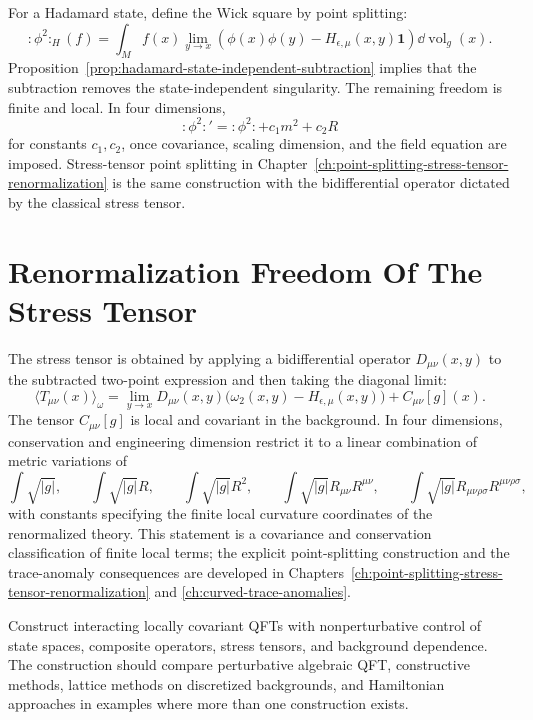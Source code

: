For a Hadamard state, define the Wick square by point splitting:
\[
  :\!\phi^2\!:_H(f)
  =
  \int_M f(x)
  \lim_{y\to x}
  \left(\phi(x)\phi(y)-H_{\epsilon,\mu}(x,y)\mathbf 1\right)
  \dd\operatorname{vol}_g(x).
\]
Proposition~\ref{prop:hadamard-state-independent-subtraction} implies that
the subtraction removes the state-independent singularity.  The remaining
freedom is finite and local.  In four dimensions,
\[
  :\!\phi^2\!:'=
  :\!\phi^2\!:+c_1m^2+c_2R
\]
for constants \(c_1,c_2\), once covariance, scaling dimension, and the field
equation are imposed.  Stress-tensor point splitting in
Chapter~\ref{ch:point-splitting-stress-tensor-renormalization} is the same
construction with the bidifferential operator dictated by the classical stress
tensor.

\section{Renormalization Freedom Of The Stress Tensor}

The stress tensor is obtained by applying a bidifferential operator
\(D_{\mu\nu}(x,y)\) to the subtracted two-point expression and then taking
the diagonal limit:
\[
  \langle T_{\mu\nu}(x)\rangle_\omega
  =
  \lim_{y\to x}
  D_{\mu\nu}(x,y)
  \bigl(\omega_2(x,y)-H_{\epsilon,\mu}(x,y)\bigr)
  +
  C_{\mu\nu}[g](x).
\]
The tensor \(C_{\mu\nu}[g]\) is local and covariant in the background.  In
four dimensions, conservation and engineering dimension restrict it to a
linear combination of metric variations of
\[
  \int\sqrt{|g|},\qquad
  \int\sqrt{|g|}R,\qquad
  \int\sqrt{|g|}R^2,\qquad
  \int\sqrt{|g|}R_{\mu\nu}R^{\mu\nu},\qquad
  \int\sqrt{|g|}R_{\mu\nu\rho\sigma}R^{\mu\nu\rho\sigma},
\]
with constants specifying the finite local curvature coordinates of the
renormalized theory.  This statement is a covariance and conservation
classification of finite local terms; the explicit point-splitting
construction and the trace-anomaly consequences are developed in
Chapters~\ref{ch:point-splitting-stress-tensor-renormalization} and
\ref{ch:curved-trace-anomalies}.

\begin{openproblem}
\label{op:interacting-curved-spacetime-qft}
Construct interacting locally covariant QFTs with nonperturbative control of
state spaces, composite operators, stress tensors, and background dependence.
The construction should compare perturbative algebraic QFT, constructive
methods, lattice methods on discretized backgrounds, and Hamiltonian
approaches in examples where more than one construction exists.
\end{openproblem}
